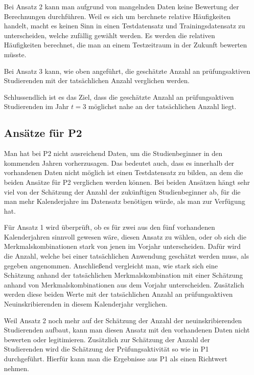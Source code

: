 Bei Ansatz 2 kann man aufgrund von mangelnden Daten keine Bewertung der Berechnungen durchf\"uhren. Weil es sich um berchnete relative H\"aufigkeiten
handelt, macht es keinen Sinn in einen Testdatensatz und Trainingsdatensatz zu unterscheiden, welche zuf\"allig gew\"ahlt werden. Es werden die relativen
H\"aufigkeiten berechnet, die man an einem Testzeitraum in der Zukunft bewerten m\"usste.

Bei Ansatz 3 kann, wie oben angef\"uhrt, die gesch\"atzte Anzahl an pr\"ufungsaktiven Studierenden mit der tats\"achlichen Anzahl verglichen werden.

Schlussendlich ist es das Ziel, dass die gesch\"atzte Anzahl an pr\"ufungsaktiven Studierenden im Jahr $t = 3$ m\"oglichst nahe an der tats\"achlichen Anzahl
liegt.



\subsection{Ans\"atze f\"ur P2}

Man hat bei P2 nicht ausreichend Daten, um die Studienbeginner in den kommenden Jahren  vorherzusagen. Das bedeutet auch, dass es innerhalb der vorhandenen
Daten nicht m\"oglich ist einen Testdatensatz zu bilden, an dem die beiden Ans\"atze f\"ur P2 verglichen werden k\"onnen. Bei beiden Ans\"atzen h\"angt
sehr viel von der Sch\"atzung der Anzahl der zuk\"unftigen Studienbeginner ab, f\"ur die man mehr Kalenderjahre im Datensatz ben\"otigen w\"urde, als
man zur Verf\"ugung hat.

F\"ur Ansatz 1 wird \"uberpr\"uft, ob es f\"ur zwei aus den f\"unf vorhandenen Kalenderjahren sinnvoll gewesen w\"are, diesen Ansatz zu w\"ahlen, oder ob sich die
Merkmalskombinationen stark von jenen im Vorjahr unterscheiden. Daf\"ur wird die Anzahl, welche bei einer tats\"achlichen Anwendung gesch\"atzt werden muss,
als gegeben angenommen. Anschlie{\ss}end vergleicht man, wie stark sich eine Sch\"atzung anhand der tats\"achlichen Merkmalskombination mit einer Sch\"atzung anhand von
Merkmalskombinationen aus dem Vorjahr unterscheiden. Zus\"atzlich werden diese beiden Werte mit der tats\"achlichen Anzahl an pr\"ufungsaktiven Neuinskribierenden
in diesem Kalenderjahr verglichen.

Weil Ansatz 2 noch mehr auf der Sch\"atzung der Anzahl der neuinskribierenden Studierenden aufbaut, kann man diesen Ansatz mit den vorhandenen Daten nicht bewerten oder legitimieren.
Zus\"atzlich zur Sch\"atzung der Anzahl der Studierenden wird die Sch\"atzung der Pr\"ufungsaktivit\"at so wie in P1 durchgef\"uhrt. Hierf\"ur kann man die
Ergebnisse aus P1 als einen Richtwert nehmen.